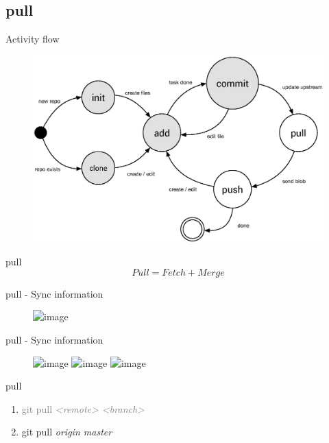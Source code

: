 \documentclass{beamer}
\begin{document}
\subsection[pull]{pull}
\begin{frame}{Activity flow}
    \begin{figure}
        \center
        \includegraphics[width=.9\textwidth]{git-command-flow-3}
        \label{fig:git-command-flow-3}
    \end{figure}
\end{frame}

\begin{frame}{pull}
    \Large{
        \[
            Pull = Fetch + Merge
        \]
    }
\end{frame}

\begin{frame}{pull - Sync information}
    \begin{figure}
        \center
        \includegraphics<1>[width=.7\textwidth]{git-pulling-information}
        \label{fig:git-pulling-information}
    \end{figure}
\end{frame}


\begin{frame}{pull - Sync information}
    \begin{figure}
        \center
        \includegraphics<1>[width=.8\textwidth]{git-pull-contents-1}
        \includegraphics<2>[width=.8\textwidth]{git-pull-contents-2}
        \includegraphics<3>[width=.8\textwidth]{git-pull-contents-3}
        \label{fig:git-pull-contents}
    \end{figure}
\end{frame}

\begin{frame}{pull}
    \Large{
        \begin{enumerate}[\$]
            \item<1-> \textcolor<2->{gray}{git pull \em{<remote>} \em{<branch>}}
            \item<2-> git pull \em{origin} \em{master}
        \end{enumerate}
    }
\end{frame}
\end{document}
